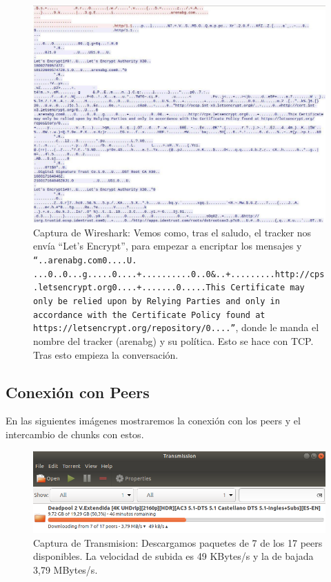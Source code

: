 \documentclass{article}
\begin{document}
\begin{figure}[H]
  \centering
  \includegraphics[width=127mm]{imagenes/trama_arenabg}
  \caption{Captura de Wireshark: Vemos como, tras el saludo, el tracker nos envía ``Let's Encrypt'', para empezar a encriptar los mensajes y \texttt{``..arenabg.com0....U. ...0..0...g.....0....+..........0..0\&..+.........http://cps.letsencrypt.org0....+.......0.....This Certificate may only be relied upon by Relying Parties and only in accordance with the Certificate Policy found at https://letsencrypt.org/repository/0....''}, donde le manda el nombre del tracker (arenabg) y su política. Esto se hace con TCP. Tras esto empieza la conversación.}
\end{figure}

\subsection{Conexión con Peers}
En las siguientes imágenes mostraremos la conexión con los peers y el intercambio de chunks con estos.

\begin{figure}[H]
  \centering
  \includegraphics[width=139mm]{imagenes/transmission-deadpool}
  \caption{Captura de Transmision: Descargamos paquetes de 7 de los 17 peers disponibles. La velocidad de subida es 49 KBytes/s y la de bajada 3,79 MBytes/s.}
\end{figure}
\end{document}
